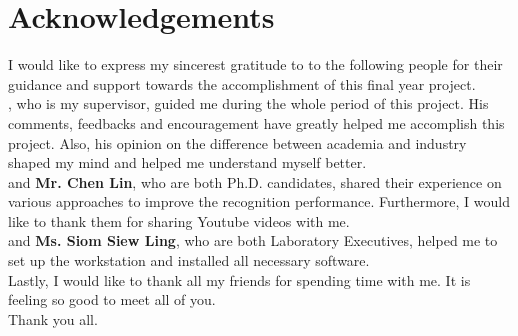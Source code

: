 \section*{Acknowledgements}

I would like to express my sincerest gratitude to to the following people for their guidance and support towards the accomplishment of this final year project. \\

, who is my supervisor, guided me during the whole period of this project. His comments, feedbacks and encouragement have greatly helped me accomplish this project. Also, his opinion on the difference between academia and industry shaped my mind and helped me understand myself better.\\

 and {\bf Mr. Chen Lin}, who are both Ph.D. candidates, shared their experience on various approaches to improve the recognition performance. Furthermore, I would like to thank them for sharing Youtube videos with me. \\

 and {\bf Ms. Siom Siew Ling}, who are both Laboratory Executives, helped me to set up the workstation and installed all necessary software. \\

\noindent Lastly, I would like to thank all my friends for spending time with me. It is feeling so good to meet all of you. \\

\noindent Thank you all.